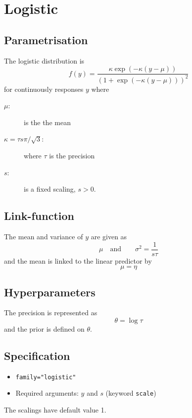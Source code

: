 \documentclass[a4paper,11pt]{article}
\begin{document}
\section*{Logistic}

\subsection*{Parametrisation}

The logistic distribution is
\begin{displaymath}
    f(y) = \frac{\kappa \exp(-\kappa(y-\mu))}{
        (1 + \exp(-\kappa(y-\mu)))^{2}}
\end{displaymath}
for continuously responses $y$ where
\begin{description}
\item[$\mu$:] is the the mean
\item[$\kappa = \tau s \pi/\sqrt{3}$:] where $\tau$ is the precision
\item[$s$:] is a fixed scaling, $s>0$.    
\end{description}

\subsection*{Link-function}

The mean and variance of $y$ are given as
\begin{displaymath}
    \mu \quad\text{and}\qquad \sigma^{2} = \frac{1}{s\tau}
\end{displaymath}
and the mean is linked to the linear predictor by
\begin{displaymath}
    \mu = \eta
\end{displaymath}

\subsection*{Hyperparameters}

The precision is represented as
\begin{displaymath}
    \theta = \log \tau
\end{displaymath}
and the prior is defined on $\theta$. 

\subsection*{Specification}

\begin{itemize}
\item \texttt{family="logistic"}
\item Required arguments: $y$ and $s$ (keyword \texttt{scale})
\end{itemize}
The scalings have default value 1.
\end{document}
